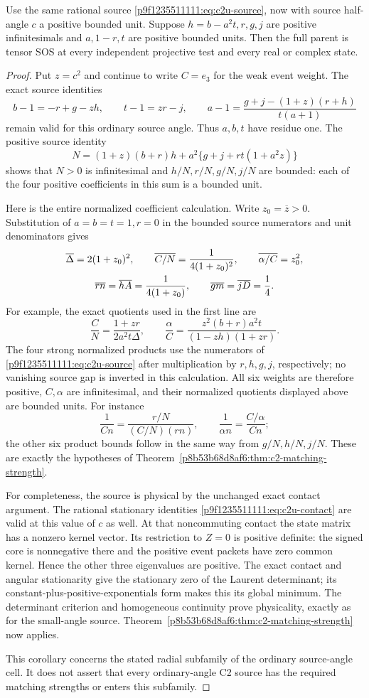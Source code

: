 \begin{corollary}
\label{p8b53b68d8af6:cor:c2-ordinary-angle-radial}
Use the same rational source \eqref{p9f1235511111:eq:c2u-source}, now with source
half-angle $c$ a positive bounded unit.  Suppose $h=b-a^2t,r,g,j$ are
positive infinitesimals and $a,1-r,t$ are positive bounded units.
Then the full parent is tensor SOS at every independent projective test
and every real or complex state.
\end{corollary}
\begin{proof}
Put $z=c^2$ and continue to write $C=e_3$ for the weak event weight.
The exact source identities
\[
 b-1=-r+g-zh,\qquad t-1=zr-j,\qquad
 a-1=\frac{g+j-(1+z)(r+h)}{t(a+1)}
\]
remain valid for this ordinary source angle.  Thus $a,b,t$ have residue
one.  The positive source identity
\[
 N=(1+z)(b+r)h+a^2\{g+j+rt(1+a^2z)\}
\]
shows that $N>0$ is infinitesimal and $h/N,r/N,g/N,j/N$ are bounded:
each of the four positive coefficients in this sum is a bounded unit.

Here is the entire normalized coefficient calculation.  Write
$z_0=\overline z>0$.  Substitution of $a=b=t=1,r=0$ in the bounded
source numerators and unit denominators gives
\begin{gather}
 \overline\Delta=2(1+z_0)^2,\qquad
 \overline{C/N}=\frac1{4(1+z_0)^2},\qquad
 \overline{\alpha/C}=z_0^2,\notag\\
 \overline{rn}=\overline{hA}=\frac1{4(1+z_0)},\qquad
 \overline{gm}=\overline{jD}=\frac14.
\label{p8b53b68d8af6:eq:c2ms-ordinary-residues}
\end{gather}
For example, the exact quotients used in the first line are
\[
 \frac CN=\frac{1+zr}{2a^2t\Delta},\qquad
 \frac\alpha C=\frac{z^2(b+r)a^2t}{(1-zh)(1+zr)}.
\]
The four strong normalized products use the numerators of
\eqref{p9f1235511111:eq:c2u-source} after multiplication by $r,h,g,j$, respectively;
no vanishing source gap is inverted in this calculation.
All six weights are therefore positive, $C,\alpha$ are infinitesimal,
and their normalized quotients displayed above are bounded units.
For instance
\[
 \frac1{Cn}=\frac{r/N}{(C/N)(rn)},\qquad
 \frac1{\alpha n}=\frac{C/\alpha}{Cn};
\]
the other six product bounds follow in the same way from $g/N,h/N,j/N$.
These are exactly the hypotheses of Theorem~\ref{p8b53b68d8af6:thm:c2-matching-strength}.

For completeness, the source is physical by the unchanged exact contact
argument.  The rational stationary identities
\eqref{p9f1235511111:eq:c2u-contact} are valid at this value of $c$ as well.
At that noncommuting contact the state matrix has a nonzero kernel
vector.  Its restriction to $Z=0$ is positive definite: the signed core
is nonnegative there and the positive event packets have zero common
kernel.  Hence the other three eigenvalues are positive.  The exact
contact and angular stationarity give the stationary zero of the
Laurent determinant; its constant-plus-positive-exponentials form makes
this its global minimum.  The determinant criterion and homogeneous
continuity prove physicality, exactly as for the small-angle source.
Theorem~\ref{p8b53b68d8af6:thm:c2-matching-strength} now applies.

This corollary concerns the stated radial subfamily of the ordinary
source-angle cell.  It does not assert that every ordinary-angle C2
source has the required matching strengths or enters this subfamily.
\end{proof}
